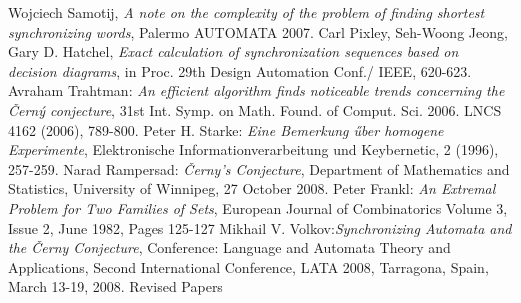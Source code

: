 \documentclass[12pt,a4paper]{article}
\begin{document}
\begin{thebibliography}{99}
 Wojciech Samotij, \textit{A note on the complexity of the problem of finding shortest synchronizing words}, Palermo AUTOMATA 2007.
 Carl Pixley, Seh-Woong Jeong, Gary D. Hatchel, \textit{Exact calculation of synchronization sequences based on decision diagrams}, in Proc. 29th Design Automation Conf./ IEEE, 620-623.
 Avraham Trahtman: \textit{An efficient algorithm finds noticeable trends concerning the \v Cern\'y conjecture}, 31st Int. Symp. on Math. Found. of Comput. Sci. 2006. LNCS 4162 (2006), 789-800.
 Peter H. Starke: \textit{Eine Bemerkung \H uber homogene Experimente}, Elektronische Informationverarbeitung und Keybernetic, 2 (1996), 257-259.
 Narad Rampersad: \textit{\v Cerny's Conjecture}, Department of Mathematics and Statistics, University of Winnipeg, 27 October 2008.
 Peter Frankl: \textit{An Extremal Problem for Two Families of Sets}, European Journal of Combinatorics
Volume 3, Issue 2, June 1982, Pages 125-127
 Mikhail V. Volkov:\textit{Synchronizing Automata and the \v Cerny Conjecture}, Conference: Language and Automata Theory and Applications, Second International Conference, LATA 2008, Tarragona, Spain, March 13-19, 2008. Revised Papers
\end{thebibliography}
\end{document}
